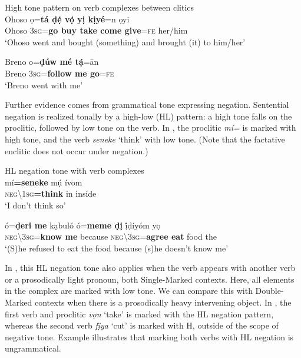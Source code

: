 \documentclass[output=paper]{langsci/langscibook}
\begin{document}
\ea
{High tone pattern on verb complexes between clitics} \\
\gll   Ohoso   ọ=\textbf{tá  ḍẹ́    vọ́    yị    kịyé}=n   ọyi\\
     Ohoso    \textsc{3sg}=\textbf{go  buy    take  come  give}=\textsc{fe}   her/him\\
\glt ‘Ohoso went and bought (something) and brought (it) to him/her’ \citep[121]{Kari2004}
\z

\ea
\gll   Breno   o=\textbf{ḍúw    mé   tạ́}=ān\\
     Breno   3\textsc{sg}=\textbf{follow  me   go}=\textsc{fe}\\
\glt ‘Breno went with me’ \citep[115]{Kari2004}
\z

Further evidence comes from grammatical tone expressing negation. Sentential negation is realized tonally by a high-low (HL) pattern: a high tone falls on the proclitic, followed by low tone on the verb. In , the proclitic \textit{mí=} is marked with high tone, and the verb \textit{seneke} ‘think’ with low tone. (Note that the factative enclitic does not occur under negation.)

\ea
{HL negation tone with verb complexes} \\
\gll   mí\textbf{=seneke}      mụ́   ívom\\
     \textsc{neg{\textbackslash}1sg}\textbf{=think}    in   inside\\
\glt ‘I don’t think so’ \citep[32]{Kari2004}
\z

\ea
\gll   ó=\textbf{ḍeri       me}   kạbuló   ó=\textbf{meme     ḍị}   ị́ḍíyóm   yọ\\
     \textsc{neg{\textbackslash}3sg}=\textbf{know  me}    because   \textsc{neg{\textbackslash}3sg}=\textbf{agree   eat}   food   the\\
\glt ‘(S)he refused to eat the food because (s)he doesn’t know me’ \citep[45]{Kari2004}  
\z

In , this HL negation tone also applies when the verb appears with another verb or a prosodically light pronoun, both Single-Marked contexts. Here, all elements in the complex are marked with low tone. We can compare this with Double-Marked contexts when there is a prosodically heavy intervening object. In , the first verb and proclitic \textit{vọn} ‘take’ is marked with the HL negation pattern, whereas the second verb \textit{fịya} ‘cut’ is marked with H, outside of the scope of negative tone. Example  illustrates that marking both verbs with HL negation is ungrammatical. 
\end{document}
